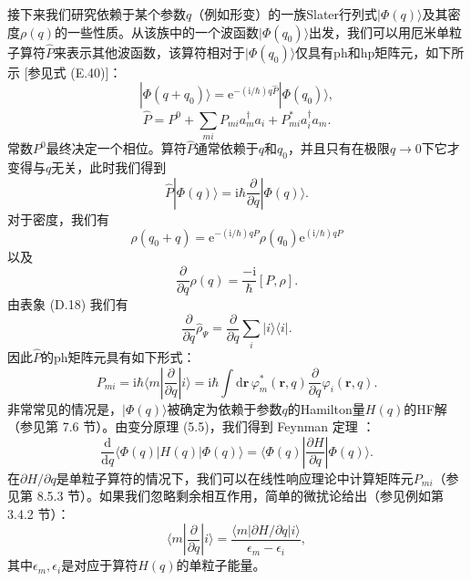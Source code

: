 接下来我们研究依赖于某个参数$q$（例如形变）的一族Slater行列式$|\Phi(q)\rangle$及其密度$\rho(q)$的一些性质。从该族中的一个波函数$|\Phi(q_{0})\rangle$出发，我们可以用厄米单粒子算符$\hat{P}$来表示其他波函数，该算符相对于$|\Phi(q_{0})\rangle$仅具有$\text{ph}$和$\text{hp}$矩阵元，如下所示
{[}参见式 (E.40){]}：
\begin{equation}
|\Phi(q+q_{0})\rangle=\mathrm{e}^{-(\mathrm{i}/\hbar)q\hat{P}}|\Phi(q_{0})\rangle,\label{eq:appendix_d_phi_translation}
\end{equation}
\begin{equation}
\hat{P}=P^{0}+\sum_{mi}P_{mi}a^{\dagger}_{m}a_{i}+P^{*}_{mi}a^{\dagger}_{i}a_{m}.\label{eq:appendix_d_p_operator}
\end{equation}
常数$P^{0}$最终决定一个相位。算符$\hat{P}$通常依赖于$q$和$q_{0}$，并且只有在极限$q\to0$下它才变得与$q$无关，此时我们得到
\begin{equation}
\hat{P}|\Phi(q)\rangle=\mathrm{i}\hbar\frac{\partial}{\partial q}|\Phi(q)\rangle.\label{eq:appendix_d_p_derivative}
\end{equation}
对于密度，我们有
\begin{equation}
\rho(q_{0}+q)=\mathrm{e}^{-(\mathrm{i}/\hbar)qP}\rho(q_{0})\mathrm{e}^{(\mathrm{i}/\hbar)qP}\label{eq:appendix_d_rho_translation}
\end{equation}
以及
\begin{equation}
\frac{\partial}{\partial q}\rho(q)=\frac{-\mathrm{i}}{\hbar}[P,\rho].\label{eq:appendix_d_rho_derivative}
\end{equation}
由表象 (D.18) 我们有
\begin{equation}
\frac{\partial}{\partial q}\hat{\rho}_{\Psi}=\frac{\partial}{\partial q}\sum_{i}|i\rangle\langle i|.\label{eq:appendix_d_rho_op_derivative}
\end{equation}
因此$\hat{P}$的$\text{ph}$矩阵元具有如下形式：
\begin{equation}
P_{mi}=\mathrm{i}\hbar\langle m|\frac{\partial}{\partial q}|i\rangle=\mathrm{i}\hbar\int\mathrm{d}\boldsymbol{r}\,\varphi^{*}_{m}(\boldsymbol{r},q)\frac{\partial}{\partial q}\varphi_{i}(\boldsymbol{r},q).\label{eq:appendix_d_p_mi_matrix_el}
\end{equation}
非常常见的情况是，$|\Phi(q)\rangle$被确定为依赖于参数$q$的Hamilton量$H(q)$的HF解（参见第
7.6 节）。由变分原理 (5.5)，我们得到 Feynman 定理 \cite{Fe39}：
\begin{equation}
\frac{\mathrm{d}}{\mathrm{d}q}\langle\Phi(q)|H(q)|\Phi(q)\rangle=\langle\Phi(q)|\frac{\partial H}{\partial q}|\Phi(q)\rangle.\label{eq:appendix_d_feynman_theorem}
\end{equation}
在$\partial H/\partial q$是单粒子算符的情况下，我们可以在线性响应理论中计算矩阵元$P_{mi}$（参见第
8.5.3 节）。如果我们忽略剩余相互作用，简单的微扰论给出（参见例如第 3.4.2 节）：
\begin{equation}
\langle m|\frac{\partial}{\partial q}|i\rangle=\frac{\langle m|\partial H/\partial q|i\rangle}{\epsilon_{m}-\epsilon_{i}},\label{eq:appendix_d_perturbation_p_mi}
\end{equation}
其中$\epsilon_{m},\epsilon_{i}$是对应于算符$H(q)$的单粒子能量。

